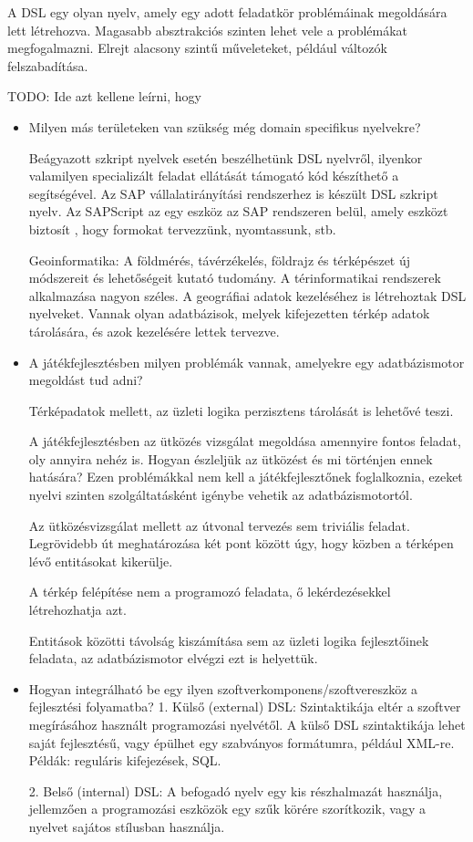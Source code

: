 
A DSL egy olyan nyelv, amely egy adott feladatkör problémáinak megoldására lett létrehozva. Magasabb absztrakciós szinten lehet vele a problémákat megfogalmazni.
Elrejt alacsony szintű műveleteket, például változók felszabadítása.

TODO: Ide azt kellene leírni, hogy
\begin{itemize}
\item Milyen más területeken van szükség még domain specifikus nyelvekre?

Beágyazott szkript nyelvek esetén beszélhetünk DSL nyelvről, ilyenkor valamilyen specializált feladat ellátását támogató kód készíthető a segítségével. Az SAP vállalatirányítási rendszerhez is készült DSL szkript nyelv. Az SAPScript az egy eszköz az SAP rendszeren belül, amely eszközt biztosít , hogy formokat tervezzünk, nyomtassunk, stb.

Geoinformatika: A földmérés, távérzékelés, földrajz és térképészet új módszereit és lehetőségeit kutató tudomány. A térinformatikai rendszerek alkalmazása nagyon széles. A geográfiai adatok kezeléséhez is létrehoztak DSL nyelveket. Vannak olyan adatbázisok, melyek kifejezetten térkép adatok tárolására, és azok kezelésére lettek tervezve.


\item A játékfejlesztésben milyen problémák vannak, amelyekre egy adatbázismotor megoldást tud adni?

Térképadatok mellett, az üzleti logika perzisztens tárolását is lehetővé teszi.

A játékfejlesztésben az ütközés vizsgálat megoldása amennyire fontos feladat, oly annyira nehéz is. Hogyan észleljük az ütközést és mi történjen ennek hatására?
Ezen problémákkal nem kell a játékfejlesztőnek foglalkoznia, ezeket nyelvi szinten szolgáltatásként igénybe vehetik az adatbázismotortól.

Az ütközésvizsgálat mellett az útvonal tervezés sem triviális feladat. Legrövidebb út meghatározása két pont között úgy, hogy közben a térképen lévő entitásokat kikerülje.

A térkép felépítése nem a programozó feladata, ő lekérdezésekkel létrehozhatja azt.

Entitások közötti távolság kiszámítása sem az üzleti logika fejlesztőinek feladata, az adatbázismotor elvégzi ezt is helyettük.



\item Hogyan integrálható be egy ilyen szoftverkomponens/szoftvereszköz a fejlesztési folyamatba?
1. Külső (external) DSL: Szintaktikája eltér a szoftver megírásához használt programozási nyelvétől. A külső DSL szintaktikája lehet saját fejlesztésű, vagy épülhet egy szabványos formátumra, például XML-re.
Példák: reguláris kifejezések, SQL.

2. Belső (internal) DSL: A befogadó nyelv egy kis részhalmazát használja, jellemzően a programozási eszközök egy szűk körére szorítkozik, vagy a nyelvet sajátos stílusban használja.
\end{itemize}